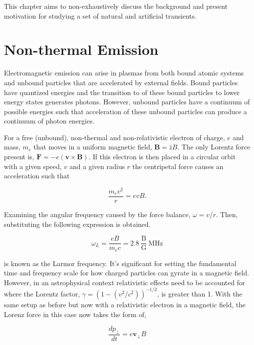 This chapter aims to non-exhaustively discuss the background and present motivation for studying a set of natural and artificial transients. 

\section{Non-thermal Emission} \label{sec:nonthermal}

Electromagnetic emission can arise in plasmas from both bound atomic systems and unbound particles that are accelerated by external fields. Bound particles have quantized energies and the transition to of these bound particles to lower energy states generates photons. However, unbound particles have a continuum of possible energies such that acceleration of these unbound particles can produce a continuum of photon energies. 

For a free (unbound), non-thermal and non-relativistic electron of charge, $e$ and mass, $m_e$ that moves in a uniform magnetic field, $\mathbf{B} = \hat z B$. The only Lorentz force present is, $\mathbf{F} = -e(\mathbf{v} \times \textbf{B})$. If this electron is then placed in a circular orbit with a given speed, $v$ and a given radius $r$ the centripetal force causes an acceleration such that 

\begin{equation}
    \frac{m_ev^2}{r} =evB.
\end{equation}

Examining the angular frequency caused by the force balance, $\omega = v/r$. Then, substituting the following expression is obtained.

\begin{equation}
    \omega_L = \frac{eB}{m_ec} = 2.8~\frac{\text{B}}{\text{G}}~ \text{MHz}
    \label{eq: Larmor Freq}
\end{equation}

 is known as the Larmor frequency. It's significant for setting the fundamental time and frequency scale for how charged particles can gyrate in a magnetic field. However, in an astrophysical context relativistic effects need to be accounted for where the Lorentz factor, $\gamma=(1-(v^2/c^2))^{-1/2}$, is greater than 1. With the same setup as before but now with a relativistic electron in a magnetic field, the Lorenz force in this case now takes the form of, 

\begin{equation}
    \frac{d p_\perp}{dt} = e \textbf{v}_\perp B
\end{equation}

